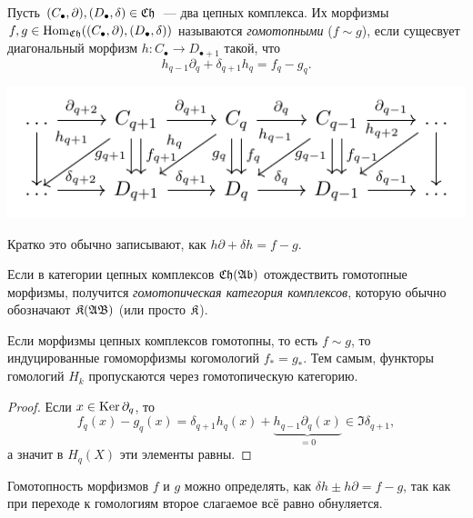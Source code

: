     \begin{definition}
        Пусть $(C_{\bullet}, \partial), (D_{\bullet}, \delta) \in \mathfrak{C}\mathfrak{h}$~--- два цепных комплекса. Их морфизмы $f, g \in \operatorname{Hom}_{\mathfrak{C}\mathfrak{h}}((C_{\bullet}, \partial), (D_{\bullet}, \delta))$
        называются \emph{гомотопными} ($f \sim g$), если сущесвует диагональный морфизм $h\colon C_{\bullet} \to D_{\bullet + 1}$ такой, что
        \[ h_{q - 1}\partial_{q} + \delta_{q + 1} h_{q} = f_{q} - g_{q}.  \]
        \begin{center}
            \includegraphics{lectures/0/pictures/cd_3}
        \end{center}
        Кратко это обычно записывают, как $h \partial + \delta h = f - g$.

        Если в категории цепных комплексов $\mathfrak{C}\mathfrak{h}(\mathfrak{A}\mathfrak{b})$ отождествить гомотопные морфизмы, получится \emph{гомотопическая категория комплексов}, которую обычно обозначают
        $\mathfrak{K}(\mathfrak{A}\mathfrak{B})$ (или просто $\mathfrak{K}$).
    \end{definition}

    \begin{theorem}\label{HomotopyMorphism}
        Если морфизмы цепных комплексов гомотопны, то есть $f \sim g$, то индуцированные гомоморфизмы когомологий $f_{*} = g_{*}$. Тем самым, функторы гомологий $H_{k}$ пропускаются через гомотопическую категорию.
    \end{theorem}

    \begin{proof}
        Если $x \in \operatorname{Ker}{\partial_{q}}$, то
        \[ f_{q}(x) - g_{q}(x) = \delta_{q + 1} h_{q}(x) + \underbrace{h_{q - 1} \partial_{q}(x)}_{= 0} \in \Im{\delta_{q + 1}},  \]
        а значит в $H_{q}(X)$ эти элементы равны.
    \end{proof}
    \begin{remark}
       Гомотопность морфизмов $f$ и $g$ можно определять, как $\delta h \pm h \partial = f - g$, так как при переходе к гомологиям
       второе слагаемое всё равно обнуляется.
    \end{remark}
    
